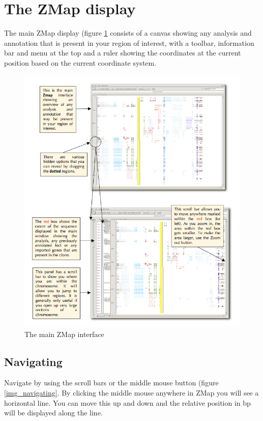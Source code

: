 \documentclass[letterpaper]{article}
\begin{document}
\clearpage
\section{The ZMap display}

The main ZMap display (figure \ref{img_main_interface} consists of a canvas showing any analysis and annotation that is present in your region of interest, with a toolbar, information bar and menu at the top and a ruler showing the coordinates at the current position based on the current coordinate system.

\begin{figure}
\centering
\color[rgb]{0.30980393,0.5058824,0.7411765}
\includegraphics[width=15.231cm]{img_main_interface.png}
\caption{The main ZMap interface}
\label{img_main_interface}
\end{figure}

\subsection{Navigating}
Navigate by using the scroll bars or the middle mouse button (figure \ref{img_navigating}. By clicking the middle mouse anywhere in ZMap you will see a horizontal line. You can move this up and down and the relative position in bp will be displayed along the line.
\end{document}
